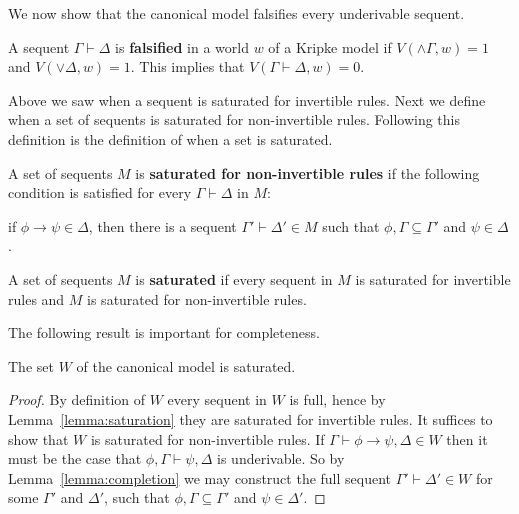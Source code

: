 \documentclass{article}
\begin{document}
We now show that the canonical model falsifies every underivable sequent. 
\begin{definition}
  \label{def:Falsification}
  A sequent $\Gamma \vdash \Delta$ is \textbf{falsified} in a world $w$ of a Kripke model if
  $V(\land \Gamma,w) = 1$ and $V(\lor \Delta, w) = 1$.  This implies that $V(\Gamma \vdash \Delta, w) = 0$.
\end{definition}

Above we saw when a sequent is saturated for invertible rules.  Next we define when a set of sequents 
is saturated for non-invertible rules. Following this definition is the definition of when a set is
saturated.
\begin{definition}
  \label{def:sat_non-invert_rules}
  A set of sequents $M$ is \textbf{saturated for non-invertible rules} if the
  following condition is satisfied for every $\Gamma \vdash \Delta$
  in $M$:
  \begin{center}
    if $\phi \to \psi \in \Delta$, then there is a sequent $\Gamma' \vdash \Delta' \in M$ such that
    $\phi,\Gamma \subseteq \Gamma'$ and $\psi \in \Delta$.
  \end{center}
\end{definition}

\begin{definition}
  \label{def:sat_set}
  A set of sequents $M$ is \textbf{saturated} if every sequent in $M$ is saturated for invertible rules
  and $M$ is saturated for non-invertible rules.
\end{definition}

The following result is important for completeness.

\begin{lemma}
  \label{lemma:canonical_model_is_saturated}
  The set $W$ of the canonical model is saturated.
\end{lemma}
\begin{proof}
  By definition of $W$ every sequent in $W$ is full, hence by Lemma~\ref{lemma:saturation} they are 
  saturated for invertible rules.  It suffices to show that $W$ is saturated for non-invertible rules.
  If $\Gamma \vdash \phi \to \psi,\Delta \in W$ then it must be the case that $\phi,\Gamma \vdash \psi,\Delta$
  is underivable.  So by Lemma~\ref{lemma:completion} we may construct the full sequent 
  $\Gamma' \vdash \Delta' \in W$  for some $\Gamma'$ and $\Delta'$, such that $\phi,\Gamma \subseteq \Gamma'$ and 
  $\psi \in \Delta'$.
\end{proof}
\end{document}
